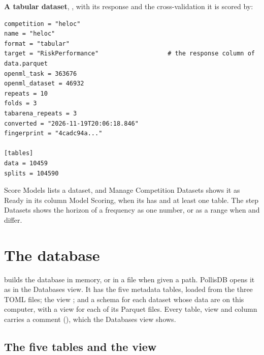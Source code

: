 \textbf{A tabular dataset}, , with its response and the cross-validation it is scored by:

\begin{lstlisting}
competition = "heloc"
name = "heloc"
format = "tabular"
target = "RiskPerformance"                   # the response column of data.parquet
openml_task = 363676
openml_dataset = 46932
repeats = 10
folds = 3
tabarena_repeats = 3
converted = "2026-11-19T20:06:18.846"
fingerprint = "4cadc94a..."

[tables]
data = 10459
splits = 104590
\end{lstlisting}

Score Models lists a dataset, and Manage Competition Datasets shows it as Ready in its column Model Scoring, when its
 has  and at least one \file{[[frequencies]]} table. The step Datasets shows
the horizon of a frequency as one number, or as a range when  and  differ.

\section{The database}
\label{sec:database}

 builds the database in memory, or in a file when given a path. PollisDB opens it as
 in the Databases view. It has the five metadata tables, loaded from the three TOML files;
the view ; and a schema for each dataset whose data are on this computer, with a view for each
of its Parquet files. Every table, view and column carries a comment (), which the Databases view
shows.

\subsection{The five tables and the view}

